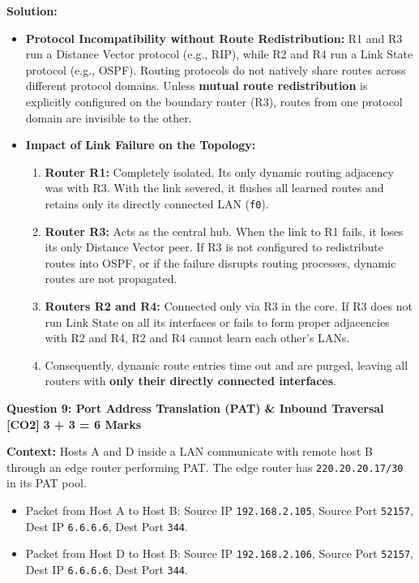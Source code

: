 \documentclass[11pt,a4paper]{article}
\newcommand{\questionheader}[3]{
    \vspace{0.35cm}
    \noindent\colorbox{qboxbg}{
        \parbox{\dimexpr\textwidth-2\fboxsep\relax}{
            \textbf{\textcolor{primary}{\large #1}} \hfill \textbf{\textcolor{accent}{[#2]}} \hfill \textbf{\textcolor{secondary}{#3 Marks}}
        }
    }
    \vspace{0.15cm}
}
\begin{document}
\textbf{Solution:}
\begin{itemize}
    \item \textbf{Protocol Incompatibility without Route Redistribution:}
    R1 and R3 run a Distance Vector protocol (e.g., RIP), while R2 and R4 run a Link State protocol (e.g., OSPF). Routing protocols do not natively share routes across different protocol domains. Unless \textbf{mutual route redistribution} is explicitly configured on the boundary router (R3), routes from one protocol domain are invisible to the other.
    \item \textbf{Impact of Link Failure on the Topology:}
    \begin{enumerate}
        \item \textbf{Router R1:} Completely isolated. Its only dynamic routing adjacency was with R3. With the link severed, it flushes all learned routes and retains only its directly connected LAN (\texttt{f0}).
        \item \textbf{Router R3:} Acts as the central hub. When the link to R1 fails, it loses its only Distance Vector peer. If R3 is not configured to redistribute routes into OSPF, or if the failure disrupts routing processes, dynamic routes are not propagated.
        \item \textbf{Routers R2 and R4:} Connected only via R3 in the core. If R3 does not run Link State on all its interfaces or fails to form proper adjacencies with R2 and R4, R2 and R4 cannot learn each other's LANs.
        \item Consequently, dynamic route entries time out and are purged, leaving all routers with \textbf{only their directly connected interfaces}.
    \end{enumerate}
\end{itemize}

\newpage
\questionheader{Question 9: Port Address Translation (PAT) \& Inbound Traversal}{CO2}{3 + 3 = 6}

\textbf{Context:}
Hosts A and D inside a LAN communicate with remote host B through an edge router performing PAT. The edge router has \texttt{220.20.20.17/30} in its PAT pool.
\begin{itemize}
    \item Packet from Host A to Host B: Source IP \texttt{192.168.2.105}, Source Port \texttt{52157}, Dest IP \texttt{6.6.6.6}, Dest Port \texttt{344}.
    \item Packet from Host D to Host B: Source IP \texttt{192.168.2.106}, Source Port \texttt{52157}, Dest IP \texttt{6.6.6.6}, Dest Port \texttt{344}.
\end{itemize}
\end{document}
